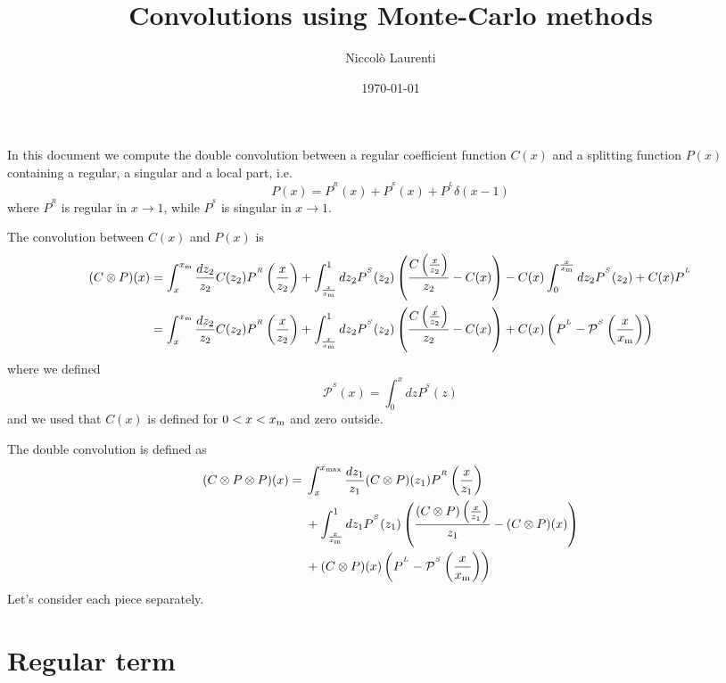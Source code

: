 \documentclass[a4paper]{article}
\title{Convolutions using Monte-Carlo methods}
\author{Niccolò Laurenti}
\date{\today}
\newcommand{\PR}[0]{P^{^R}}
\newcommand{\PS}[0]{P^{^S}}
\newcommand{\PmS}[0]{\mathcal{P}^{^S}}
\newcommand{\PL}[0]{P^{^L}}
\newcommand{\xm}[0]{x_{\rm m}}
\begin{document}
	In this document we compute the double convolution between a regular coefficient function $C(x)$ and a splitting function $P(x)$ containing a regular, a singular and a local part, i.e.
	\begin{equation}
		P(x) = P^{^R}(x) + P^{^S}(x) + P^{^L} \delta(x-1)
	\end{equation}
where $\PR$ is regular in $x\rightarrow 1$, while $\PS$ is singular in $x\rightarrow 1$.

The convolution between $C(x)$ and $P(x)$ is
\begin{equation}
	\begin{split}
	(C \otimes P)(x)&=\int_x^{\xm} \frac{dz_2}{z_2} C(z_2) \PR \left(\frac{x}{z_2}\right) + \int_{\frac{x}{\xm}}^1dz_2 \PS(z_2) \left( \frac{C\left(\frac{x}{z_2}\right)}{z_2} - C(x)\right)-C(x)\int_0^{\frac{x}{\xm}}dz_2\PS(z_2) + C(x)\PL \\
	&=\int_x^{\xm} \frac{dz_2}{z_2} C(z_2) \PR \left(\frac{x}{z_2}\right) + \int_{\frac{x}{\xm}}^1dz_2 \PS(z_2) \left( \frac{C\left(\frac{x}{z_2}\right)}{z_2} - C(x)\right)+ C(x)\left(\PL - \PmS\left(\frac{x}{\xm}\right)\right)
\end{split}
\end{equation}
where we defined
\begin{equation*}
	\PmS(x) = \int_0^{x}dz\PS(z)
\end{equation*}
and we used that $C(x)$ is defined for $0<x<\xm$ and zero outside.

The double convolution is defined as
\begin{equation}
	\begin{split}
		(C \otimes P \otimes P)(x)  ={}& \int_x^{x_{\rm max}} \frac{dz_1}{z_1} (C \otimes P)(z_1) \PR \left(\frac{x}{z_1}\right) \\
		&+ \int_{\frac{x}{\xm}}^1dz_1 \PS(z_1) \left( \frac{(C \otimes P)\left(\frac{x}{z_1}\right)}{z_1} - (C \otimes P)(x)\right)\\
		& + (C \otimes P)(x)\left(\PL - \PmS\left(\frac{x}{\xm}\right)\right)
	\end{split}
\end{equation}
Let's consider each piece separately.
\section{Regular term}
\end{document}
